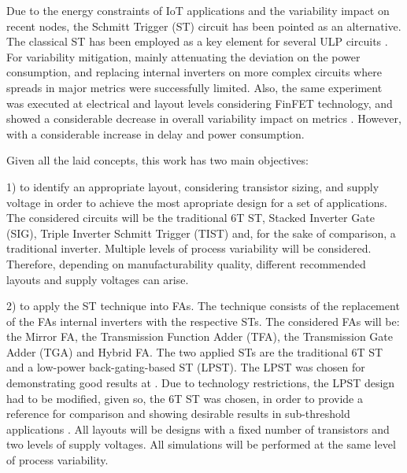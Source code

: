 \documentclass[pgmicro,mestrado,english]{iiufrgs}
\begin{document}
    Due to the energy constraints of IoT applications and the variability impact on recent nodes, the Schmitt Trigger (ST) circuit has been pointed as an alternative. The classical ST has been employed as a key element for several ULP circuits \cite{kulkarni2007160, hays201262, melek:17, lotze2017ultra}. For variability mitigation, mainly attenuating the deviation on the power consumption, and replacing internal inverters on more complex circuits \cite{dokania2015circuit} where spreads in major metrics were successfully limited. Also, the same experiment was executed at electrical and layout levels considering FinFET technology, and showed a considerable decrease in overall variability impact on metrics \cite{toledo2018pros,moraes2018evaluation}. However, with a considerable increase in delay and power consumption.


	Given all the laid concepts, this work has two main objectives:

	1) to identify an appropriate layout, considering transistor sizing, and supply voltage in order to achieve the most apropriate design for a set of applications. The considered circuits will be the traditional 6T ST, Stacked Inverter Gate (SIG), Triple Inverter Schmitt Trigger (TIST) and, for the sake of comparison, a traditional inverter. Multiple levels of process variability will be considered. Therefore, depending on manufacturability quality, different recommended layouts and supply voltages can arise.

	2) to apply the ST technique into FAs. The technique consists of the replacement of the FAs internal inverters with the respective STs. The considered FAs will be: the Mirror FA, the Transmission Function Adder (TFA), the Transmission Gate Adder (TGA) and Hybrid FA. The two applied STs are the traditional 6T ST and a low-power back-gating-based ST (LPST). The LPST was chosen for demonstrating good results at \cite{dokania2015circuit}. Due to technology restrictions, the LPST design had to be modified, given so, the 6T ST was chosen, in order to provide a reference for comparison and showing desirable results in sub-threshold applications \cite{lotze2017ultra}. All layouts will be designs with a fixed number of transistors and two levels of supply voltages. All simulations will be performed at the same level of process variability.
\end{document}

